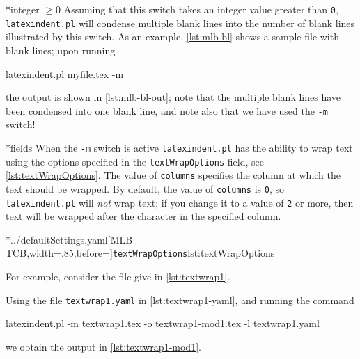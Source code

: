 *{integer $\geq 0$}
	Assuming that this switch takes an integer value greater than \texttt{0}, \texttt{latexindent.pl} will condense multiple blank lines into the number of blank lines illustrated by this switch.
	As an example, \cref{lst:mlb-bl} shows a sample file with blank lines; upon running \begin{commandshell}
latexindent.pl myfile.tex -m  
\end{commandshell} the output is shown in \cref{lst:mlb-bl-out}; note that the multiple blank lines have been condensed into one blank line, and note also that we have used the \texttt{-m} switch!

	\begin{minipage}{.45\textwidth}
	\end{minipage}%
	\hfill
	\begin{minipage}{.45\textwidth}
	\end{minipage}

*{fields}
	When the \texttt{-m} switch is active \texttt{latexindent.pl} has the ability to wrap text using the options%
	 specified in the \texttt{textWrapOptions} field, see \cref{lst:textWrapOptions}.
	The value of \texttt{columns} specifies the column at which the text should be wrapped.
	By default, the value of \texttt{columns} is \texttt{0}, so \texttt{latexindent.pl} will \emph{not} wrap text; if you change it to a value of \texttt{2} or more, then text will be wrapped after the character in the specified column.

	\cmhlistingsfromfile[style=textWrapOptions]*{../defaultSettings.yaml}[MLB-TCB,width=.85\linewidth,before=\centering]{\texttt{textWrapOptions}}{lst:textWrapOptions}

	For example, consider the file give in \cref{lst:textwrap1}.

	\begin{widepage}
	\end{widepage}

	Using the file \texttt{textwrap1.yaml} in \cref{lst:textwrap1-yaml}, and running the command \begin{commandshell}
latexindent.pl -m textwrap1.tex -o textwrap1-mod1.tex -l textwrap1.yaml
\end{commandshell} we obtain the output in \cref{lst:textwrap1-mod1}.

